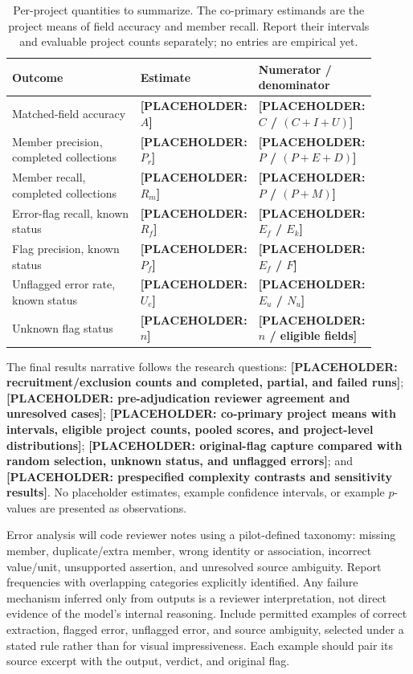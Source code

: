 \documentclass[11pt]{article}
\newcommand{\todo}[1]{\textcolor{blue!65!black}{\textbf{[PLACEHOLDER: #1]}}}
\begin{document}
\begin{table}[ht]
\centering
\caption{Per-project quantities to summarize. The co-primary estimands are the project means of field accuracy and member recall. Report their intervals and evaluable project counts separately; no entries are empirical yet.}
\label{tab:main}
\begin{tabular}{@{}p{0.48\linewidth}p{0.18\linewidth}p{0.24\linewidth}@{}}
\toprule
Outcome & Estimate & Numerator / denominator \\
\midrule
Matched-field accuracy & \todo{$A$} & \todo{$C$ / $(C+I+U)$} \\
Member precision, completed collections & \todo{$P_r$} & \todo{$P$ / $(P+E+D)$} \\
Member recall, completed collections & \todo{$R_m$} & \todo{$P$ / $(P+M)$} \\
Error-flag recall, known status & \todo{$R_f$} & \todo{$E_f$ / $E_k$} \\
Flag precision, known status & \todo{$P_f$} & \todo{$E_f$ / $F$} \\
Unflagged error rate, known status & \todo{$U_e$} & \todo{$E_u$ / $N_u$} \\
Unknown flag status & \todo{$n$} & \todo{$n$ / eligible fields} \\
\bottomrule
\end{tabular}
\end{table}

The final results narrative follows the research questions: \todo{recruitment/exclusion counts and completed, partial, and failed runs}; \todo{pre-adjudication reviewer agreement and unresolved cases}; \todo{co-primary project means with intervals, eligible project counts, pooled scores, and project-level distributions}; \todo{original-flag capture compared with random selection, unknown status, and unflagged errors}; and \todo{prespecified complexity contrasts and sensitivity results}. No placeholder estimates, example confidence intervals, or example $p$-values are presented as observations.

Error analysis will code reviewer notes using a pilot-defined taxonomy: missing member, duplicate/extra member, wrong identity or association, incorrect value/unit, unsupported assertion, and unresolved source ambiguity. Report frequencies with overlapping categories explicitly identified. Any failure mechanism inferred only from outputs is a reviewer interpretation, not direct evidence of the model's internal reasoning. Include permitted examples of correct extraction, flagged error, unflagged error, and source ambiguity, selected under a stated rule rather than for visual impressiveness. Each example should pair its source excerpt with the output, verdict, and original flag.
\end{document}
